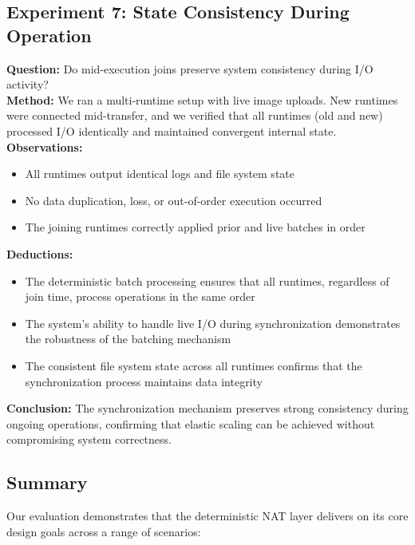 \documentclass[10pt]{IEEEtran}
\begin{document}
\subsection{Experiment 7: State Consistency During Operation}
\textbf{Question:} Do mid-execution joins preserve system consistency during I/O activity? \\
\textbf{Method:} We ran a multi-runtime setup with live image uploads. New runtimes were connected mid-transfer, and we verified that all runtimes (old and new) processed I/O identically and maintained convergent internal state. \\
\textbf{Observations:}
\begin{itemize}
    \item All runtimes output identical logs and file system state
    \item No data duplication, loss, or out-of-order execution occurred
    \item The joining runtimes correctly applied prior and live batches in order
\end{itemize}
\textbf{Deductions:}
\begin{itemize}
    \item The deterministic batch processing ensures that all runtimes, regardless of join time, process operations in the same order
    \item The system's ability to handle live I/O during synchronization demonstrates the robustness of the batching mechanism
    \item The consistent file system state across all runtimes confirms that the synchronization process maintains data integrity
\end{itemize}
\textbf{Conclusion:} The synchronization mechanism preserves strong consistency during ongoing operations, confirming that elastic scaling can be achieved without compromising system correctness.

\subsection{Summary}
Our evaluation demonstrates that the deterministic NAT layer delivers on its core design goals across a range of scenarios:
\end{document}
